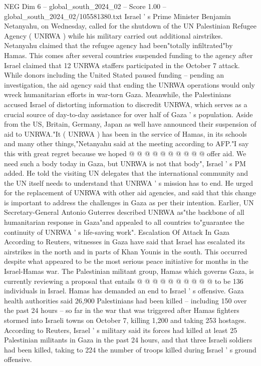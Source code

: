 \begin{textsample}{NEG Dim 6 – global\_south\_2024\_02 – Score 1.00 – global\_south\_2024\_02/105581380.txt}  \label{ex:f6_neg_279}
Israel ' s Prime Minister Benjamin Netanyahu, on Wednesday, called for the shutdown of the UN Palestinian Refugee Agency ( UNRWA ) while his military carried out additional airstrikes.
Netanyahu claimed that the refugee agency had been"totally infiltrated"by Hamas.
This comes after several countries suspended funding to the agency after Israel claimed that 12 UNRWA staffers participated in the October 7 attack.
While donors including the United Stated paused funding -- pending an investigation, the aid agency said that ending the UNRWA operations would only wreck humanitarian efforts in war-torn Gaza.
Meanwhile, the Palestinians accused Israel of distorting information to discredit UNRWA, which serves as a crucial source of day-to-day assistance for over half of Gaza ' s population.
Aside from the US, Britain, Germany, Japan as well have announced their suspension of aid to UNRWA."It ( UNRWA ) has been in the service of Hamas, in its schools and many other things,"Netanyahu said at the meeting according to AFP."I say this with great regret because we hoped @ @ @ @ @ @ @ @ @ @ offer aid.
We need such a body today in Gaza, but UNRWA is not that body", Israel ' s PM added.
He told the visiting UN delegates that the international community and the UN itself needs to understand that UNRWA ' s mission has to end.
He urged for the replacement of UNRWA with other aid agencies, and said that this change is important to address the challenges in Gaza as per their intention.
Earlier, UN Secretary-General Antonio Guterres described UNRWA as"the backbone of all humanitarian response in Gaza"and appealed to all countries to"guarantee the continuity of UNRWA ' s life-saving work".
Escalation Of Attack In Gaza According to Reuters, witnesses in Gaza have said that Israel has escalated its airstrikes in the north and in parts of Khan Younis in the south.
This occurred despite what appeared to be the most serious peace initiative for months in the Israel-Hamas war.
The Palestinian militant group, Hamas which governs Gaza, is currently reviewing a proposal that entails @ @ @ @ @ @ @ @ @ @ to be 136 individuals in Israel.
Hamas has demanded an end to Israel ' s offensive.
Gaza health authorities said 26,900 Palestinians had been killed -- including 150 over the past 24 hours -- so far in the war that was triggered after Hamas fighters stormed into Israeli towns on October 7, killing 1,200 and taking 253 hostages.
According to Reuters, Israel ' s military said its forces had killed at least 25 Palestinian militants in Gaza in the past 24 hours, and that three Israeli soldiers had been killed, taking to 224 the number of troops killed during Israel ' s ground offensive.

\end{textsample}
